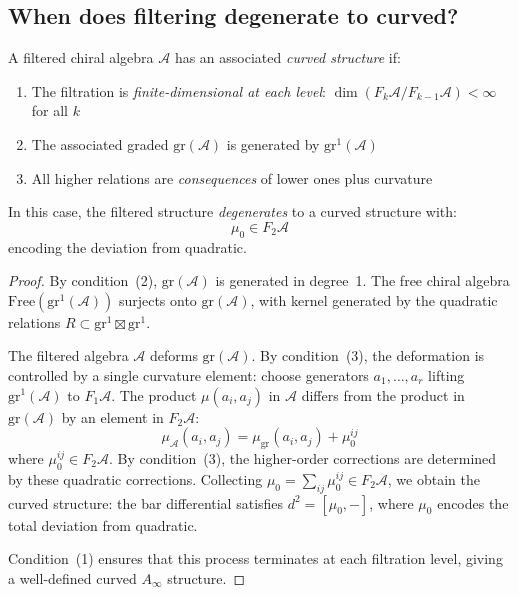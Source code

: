 \subsection{When does filtering degenerate to curved?}

\begin{proposition}\label{prop:filtered-to-curved}
A filtered chiral algebra $\mathcal{A}$ has an associated \emph{curved structure} if:
\begin{enumerate}
\item The filtration is \emph{finite-dimensional at each level}:
$\dim(F_k\mathcal{A}/F_{k-1}\mathcal{A}) < \infty$ for all $k$
\item The associated graded $\mathrm{gr}(\mathcal{A})$ is generated by $\mathrm{gr}^1(\mathcal{A})$
\item All higher relations are \emph{consequences} of lower ones plus curvature
\end{enumerate}

In this case, the filtered structure \emph{degenerates} to a curved structure with:
\[\mu_0 \in F_2\mathcal{A}\]
encoding the deviation from quadratic.
\end{proposition}

\begin{proof}
By condition~(2), $\mathrm{gr}(\mathcal{A})$ is generated in degree~1.  The free chiral algebra $\mathrm{Free}(\mathrm{gr}^1(\mathcal{A}))$ surjects onto $\mathrm{gr}(\mathcal{A})$, with kernel generated by the quadratic relations $R \subset \mathrm{gr}^1 \boxtimes \mathrm{gr}^1$.

The filtered algebra $\mathcal{A}$ deforms $\mathrm{gr}(\mathcal{A})$.  By condition~(3), the deformation is controlled by a single curvature element: choose generators $a_1, \ldots, a_r$ lifting $\mathrm{gr}^1(\mathcal{A})$ to $F_1\mathcal{A}$.  The product $\mu(a_i, a_j)$ in $\mathcal{A}$ differs from the product in $\mathrm{gr}(\mathcal{A})$ by an element in $F_2\mathcal{A}$:
\[
\mu_\mathcal{A}(a_i, a_j) = \mu_{\mathrm{gr}}(a_i, a_j) + \mu_0^{ij}
\]
where $\mu_0^{ij} \in F_2\mathcal{A}$.  By condition~(3), the higher-order corrections are determined by these quadratic corrections.  Collecting $\mu_0 = \sum_{ij} \mu_0^{ij} \in F_2\mathcal{A}$, we obtain the curved structure: the bar differential satisfies $d^2 = [\mu_0, -]$, where $\mu_0$ encodes the total deviation from quadratic.

Condition~(1) ensures that this process terminates at each filtration level, giving a well-defined curved $A_\infty$ structure.
\end{proof}


